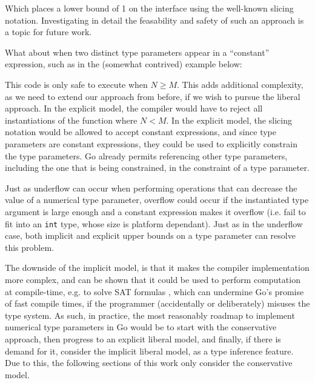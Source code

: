 
Which places a lower bound of 1 on the  interface using the well-known
slicing notation. Investigating in detail the feasability and safety of such an
approach is a topic for future work.

What about when two distinct type parameters appear in a ``constant''
expression, such as in the (somewhat contrived) example below:


This code is only safe to execute when $N \ge M$. This adds additional
complexity, as we need to extend our approach from before, if we wish to pursue
the liberal approach. In the explicit model, the compiler would have to reject
all instantiations of the function where $N < M$. In the explicit model, the
slicing notation would be allowed to accept constant expressions, and since type
parameters are constant expressions, they could be used to explicitly constrain
the type parameters. Go already permits referencing other type parameters,
including the one that is being constrained, in the constraint of a type
parameter.


Just as underflow can occur when performing operations that can decrease the
value of a numerical type parameter, overflow could occur if the instantiated
type argument is large enough and a constant expression makes it overflow (i.e.
fail to fit into an \texttt{int} type, whose size is platform dependant). Just
as in the underflow case, both implicit and explicit upper bounds on a
 type parameter can resolve this problem.

The downside of the implicit model, is that it makes the compiler implementation
more complex, and can be shown that it could be used to perform computation at
compile-time, e.g. to solve SAT formulas \autocite{goArraySAT}, which can
undermine Go's promise of fast compile times, if the programmer (accidentally or
deliberately) misuses the type system. As such, in practice, the most reasonably
roadmap to implement numerical type parameters in Go would be to start with the
conservative approach, then progress to an explicit liberal model, and finally,
if there is demand for it, consider the implicit liberal model, as a type
inference feature. Due to this, the following sections of this work only
consider the conservative model.

